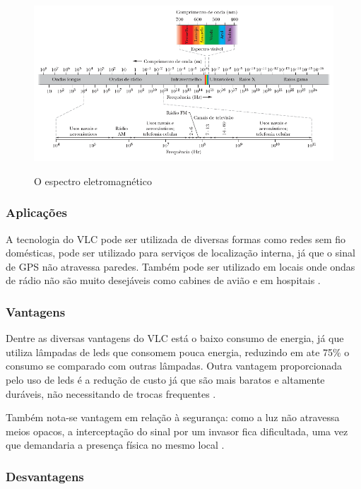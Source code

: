 \begin{figure}[!htbp]
  \caption{O espectro eletromagnético}
  \includegraphics[scale=0.7]{images/espectro_eletromagnetico.png}
  \label{fig:espectro_eletromagnetico}
\end{figure}

\subsubsection{Aplicações}

A tecnologia do VLC pode ser utilizada de diversas formas como redes sem fio domésticas, pode ser utilizado para serviços de localização interna, já que o sinal de GPS não atravessa paredes. Também pode ser utilizado em locais onde ondas de rádio não são muito desejáveis como cabines de avião e em hospitais \cite{matheus2017comunicaccao}. 

\subsubsection{Vantagens}

Dentre as diversas vantagens do VLC está o baixo consumo de energia, já que utiliza lâmpadas de leds que consomem pouca energia, reduzindo em ate 75\% o consumo se comparado com outras lâmpadas. Outra vantagem proporcionada pelo uso de leds é a redução de custo já que são mais baratos e altamente duráveis, não necessitando de trocas frequentes \cite{matheus2017comunicaccao}.

Também nota-se vantagem em relação à segurança: como a luz não atravessa meios opacos, a interceptação do sinal por um invasor fica dificultada, uma vez que demandaria a presença física no mesmo local \cite{conceiccao2015comunicaccao}.

\subsubsection{Desvantagens}

